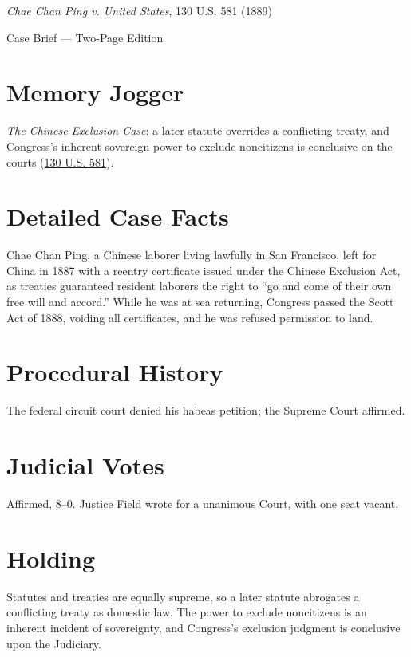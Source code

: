 \documentclass[12pt]{article}
\begin{document}
\begin{center}
{\LARGE \textit{Chae Chan Ping v. United States}, 130 U.S. 581 (1889)\par}
\vspace{0.5em}
{\large Case Brief --- Two-Page Edition\par}
\end{center}

\section{Memory Jogger}
\textit{The Chinese Exclusion Case}: a later statute overrides a conflicting treaty, and Congress's inherent sovereign power to exclude noncitizens is conclusive on the courts (\href{https://supreme.justia.com/cases/federal/us/130/581/}{130 U.S. 581}).

\section{Detailed Case Facts}
Chae Chan Ping, a Chinese laborer living lawfully in San Francisco, left for China in 1887 with a reentry certificate issued under the Chinese Exclusion Act, as treaties guaranteed resident laborers the right to ``go and come of their own free will and accord.'' While he was at sea returning, Congress passed the Scott Act of 1888, voiding all certificates, and he was refused permission to land.

\section{Procedural History}
The federal circuit court denied his habeas petition; the Supreme Court affirmed.

\section{Judicial Votes}
Affirmed, 8--0. Justice Field wrote for a unanimous Court, with one seat vacant.

\section{Holding}
Statutes and treaties are equally supreme, so a later statute abrogates a conflicting treaty as domestic law. The power to exclude noncitizens is an inherent incident of sovereignty, and Congress's exclusion judgment is conclusive upon the Judiciary.
\end{document}
